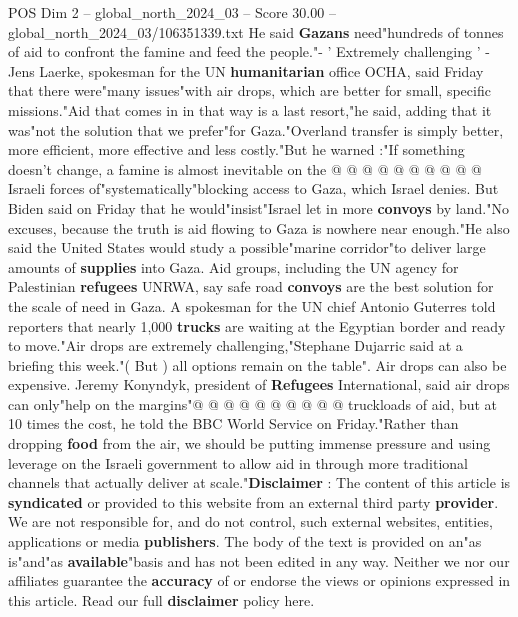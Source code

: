 \begin{textsample}{POS Dim 2 – global\_north\_2024\_03 – Score 30.00 – global\_north\_2024\_03/106351339.txt}
He said \textbf{Gazans} need"hundreds of tonnes of aid to confront the famine and feed the people."- ' Extremely challenging ' - Jens Laerke, spokesman for the UN \textbf{humanitarian} office OCHA, said Friday that there were"many issues"with air drops, which are better for small, specific missions."Aid that comes in in that way is a last resort,"he said, adding that it was"not the solution that we prefer"for Gaza."Overland transfer is simply better, more efficient, more effective and less costly."But he warned :"If something doesn't change, a famine is almost inevitable on the @ @ @ @ @ @ @ @ @ @ Israeli forces of"systematically"blocking access to Gaza, which Israel denies.
But Biden said on Friday that he would"insist"Israel let in more \textbf{convoys} by land."No excuses, because the truth is aid flowing to Gaza is nowhere near enough."He also said the United States would study a possible"marine corridor"to deliver large amounts of \textbf{supplies} into Gaza.
Aid groups, including the UN agency for Palestinian \textbf{refugees} UNRWA, say safe road \textbf{convoys} are the best solution for the scale of need in Gaza.
A spokesman for the UN chief Antonio Guterres told reporters that nearly 1,000 \textbf{trucks} are waiting at the Egyptian border and ready to move."Air drops are extremely challenging,"Stephane Dujarric said at a briefing this week."( But ) all options remain on the table".
Air drops can also be expensive.
Jeremy Konyndyk, president of \textbf{Refugees} International, said air drops can only"help on the margins"@ @ @ @ @ @ @ @ @ @ truckloads of aid, but at 10 times the cost, he told the BBC World Service on Friday."Rather than dropping \textbf{food} from the air, we should be putting immense pressure and using leverage on the Israeli government to allow aid in through more traditional channels that actually deliver at scale."\textbf{Disclaimer} : The content of this article is \textbf{syndicated} or provided to this website from an external third party \textbf{provider}.
We are not responsible for, and do not control, such external websites, entities, applications or media \textbf{publishers}.
The body of the text is provided on an"as is"and"as \textbf{available}"basis and has not been edited in any way.
Neither we nor our affiliates guarantee the \textbf{accuracy} of or endorse the views or opinions expressed in this article.
Read our full \textbf{disclaimer} policy here.

\end{textsample}
